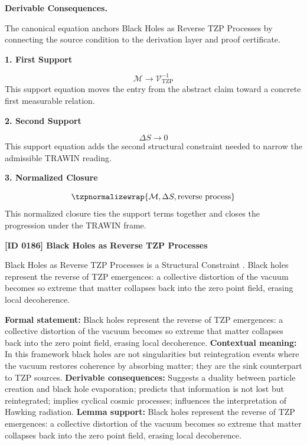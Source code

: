 \par\vspace{0.35em}
\noindent\textbf{Derivable Consequences.}\quad
\begingroup
\footnotesize
\raggedright
The canonical equation anchors Black Holes as Reverse TZP Processes by connecting the source condition to the derivation layer and proof certificate.
\par\endgroup

\noindent\textbf{1. First Support}\par
\[
\mathcal{M} \rightarrow \mathcal{V}_{\mathrm{TZP}}^{-1}
\]
\noindent This support equation moves the entry from the abstract claim toward a concrete first measurable relation.\par
\noindent\textbf{2. Second Support}\par
\[
\Delta S \rightarrow 0
\]
\noindent This support equation adds the second structural constraint needed to narrow the admissible TRAWIN reading.\par
\noindent\textbf{3. Normalized Closure}\par
\[
\tzpnormalizewrap{\mathcal{M},\Delta S,\text{reverse process}}
\]
\noindent This normalized closure ties the support terms together and closes the progression under the TRAWIN frame.\par

\clearpage
\noindent\textbf{[ID 0186] Black Holes as Reverse TZP Processes}\par
\vspace{0.35em}
\begingroup\small
{}
Black Holes as Reverse TZP Processes is a Structural Constraint  . Black holes represent the reverse of TZP emergences: a collective distortion of the vacuum becomes so extreme that matter collapses back into the zero point field, erasing local decoherence.  

\begingroup\footnotesize\setlength{\emergencystretch}{3em}\sloppy
\textbf{Formal statement:} Black holes represent the reverse of TZP emergences: a collective distortion of the vacuum becomes so extreme that matter collapses back into the zero point field, erasing local decoherence.  
\textbf{Contextual meaning:} In this framework black holes are not singularities but reintegration events where the vacuum restores coherence by absorbing matter; they are the sink counterpart to TZP sources.  
\textbf{Derivable consequences:} Suggests a duality between particle creation and black hole evaporation; predicts that information is not lost but reintegrated; implies cyclical cosmic processes; influences the interpretation of Hawking radiation.  
\textbf{Lemma support:} Black holes represent the reverse of TZP emergences: a collective distortion of the vacuum becomes so extreme that matter collapses back into the zero point field, erasing local decoherence.  \par
\endgroup

